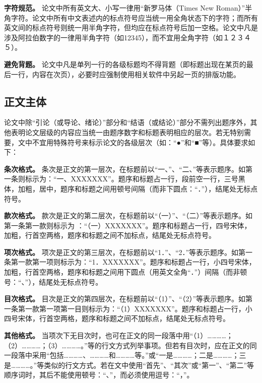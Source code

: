 \documentclass[singlesided]{Style/ucasthesis}%
\begin{document}
\textbf{字符规范。} 论文中所有英文大、小写一律用``新罗马体（Times New Roman）''半角字符。论文中所有中文表述内的标点符号应当统一用全角状态下的字符；而所有英文间的标点符号则统一用半角字符，但均应在标点符号后加一空格。论文中凡是涉及阿拉伯数字的一律用半角字符（如12345），而不宜用全角字符（如１２３４５）。

\textbf{避免背题。} 论文中凡是单列一行的各级标题均不得背题（即标题出现在某页的最后一行，内容在次页），必要时应强制使用相关软件中另起一页的排版功能。

\hypertarget{section-25}{%
\subsection{正文主体}\label{section-25}}

论文中除``引论（或导论、绪论）''部分和``结语（或结论）''部分不需列出题序外，其他表明论文层级的内容应当统一由题序数字和标题表明相应的层次。若无特别需要，文中不宜用特殊符号来标示论文的各级层次（如：``●''和``■''等）。具体要求如下：

\textbf{条次格式。} 条次是正文的第一层次，在标题前以``一、''、``二、''等表示题序。如第一条则标示为：``一、XXXXXXX''。题序和标题占一行，段前空一行，三号黑体，加粗，居中，题序和标题之间用顿号间隔（而非下圆点：``．''），结尾处无标点符号。

\textbf{款次格式。} 款次是正文的第二层次，在标题前以``（一）''、``（二）''等表示题序。如第一条第一款则标示为 ：``（一）XXXXXXX''。题序和标题占一行，四号宋体，加粗，行首空两格，题序和标题之间不加标点，结尾处无标点符号。

\textbf{项次格式。} 项次是正文的第三层次，在标题前以``1．''、``2．''等表示题序。如第一条第一款第一项则标示为：``1．XXXXXXX''。题序和标题占一行，小四号宋体，加粗，行首空两格，题序和标题之间用下圆点（用英文全角``．''）间隔（而非顿号：``、''），结尾处无标点符号。

\textbf{目次格式。} 目次是正文的第四层次，在标题前以``（1）''、``（2）''等表示题序。如第一条第一款第一项第一目则标示为：``（1）XXXXXXX''。题序和标题占一行，小四号宋体，行首空两格，题序和标题之间不加标点，结尾处无标点符号。

\textbf{其他格式。} 当项次下无目次时，也可在正文的同一段落中用``（1）\ldots{}\ldots{}\ldots{}\ldots{}；（2）\ldots{}\ldots{}\ldots{}\ldots{}；（3）\ldots{}\ldots{}\ldots{}\ldots{}。''等的行文方式列举事项。但若有目次时，应在正文的同一段落中采用``包括\ldots{}\ldots{}\ldots{}\ldots{}、\ldots{}\ldots{}\ldots{}\ldots{}和\ldots{}\ldots{}\ldots{}\ldots{}等。''或``一是\ldots{}\ldots{}\ldots{}\ldots{}；二是\ldots{}\ldots{}\ldots{}\ldots{}；三是\ldots{}\ldots{}\ldots{}\ldots{}。''等类似的行文方式。若在文中使用``首先''、``其次''或``第一''、``第二''等顺序词时，其后不能使用顿号：``、''，而必须使用逗号：``，''。
\end{document}
